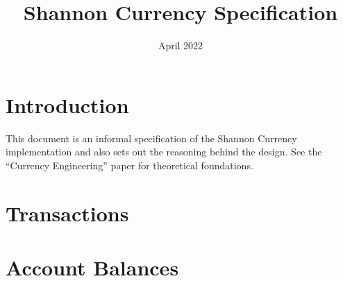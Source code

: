 \documentclass[a4paper]{book}
\begin{document}
    \title{Shannon Currency Specification}
    \date{April 2022}
    \maketitle

    \tableofcontents

\section{Introduction}

This document is an informal specification of the Shannon Currency implementation and also sets out
the reasoning behind the design. See the ``Currency Engineering'' paper for theoretical foundations.

\section{Transactions}


\section{Account Balances}
\end{document}

